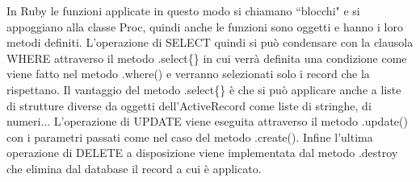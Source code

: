 \documentclass[target=bach,aauheader=,style=]{thud}
\begin{document}
In Ruby le funzioni applicate in questo modo si chiamano ``blocchi" e si appoggiano alla classe Proc, quindi anche le funzioni sono oggetti e hanno i loro metodi definiti.
L'operazione di SELECT quindi si può condensare con la clausola WHERE attraverso il metodo .select\{\} in cui verrà definita una condizione come viene fatto nel metodo .where() e verranno
selezionati solo i record che la rispettano. Il vantaggio del metodo .select\{\} è che si può applicare anche a liste di strutture diverse da oggetti dell'ActiveRecord come liste di stringhe, di numeri...
L'operazione di UPDATE viene eseguita attraverso il metodo .update() con i parametri passati come nel caso del metodo .create(). Infine l'ultima operazione di DELETE a disposizione viene implementata
dal metodo .destroy che elimina dal database il record a cui è applicato.
\end{document}
